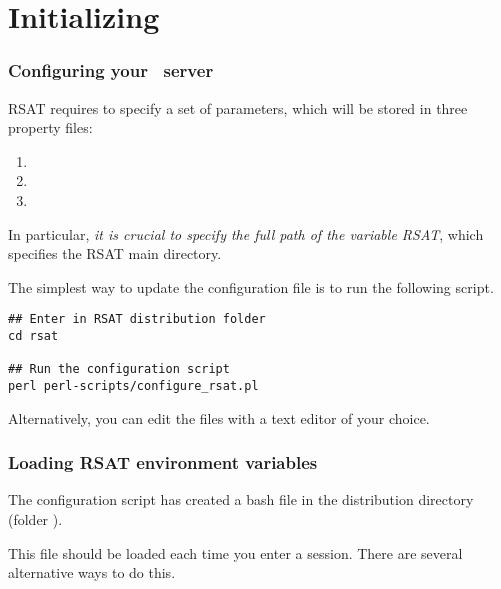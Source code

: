 \documentclass[12pt,a4paper, oneside]{scrreprt} %
\begin{document}
\chapter{Initializing \RSAT}

% 

\subsection{Configuring your \RSAT\ server}

RSAT requires to specify a set of parameters, which will be stored in
three property files:
\begin{enumerate}
\item  {}
\item  {}
\item  {}
\end{enumerate}

In particular, \emph{it is crucial to specify the full path of the
  variable RSAT}, which specifies the RSAT main directory.

The simplest way to update the configuration file is to run the
following script.

\begin{lstlisting}
## Enter in RSAT distribution folder
cd rsat

## Run the configuration script
perl perl-scripts/configure_rsat.pl
\end{lstlisting}

Alternatively, you can edit the files with a text editor of your
choice.

\subsection{Loading RSAT environment variables}

The configuration script has created a bash file
 in the \RSAT distribution directory (folder
). 

This file should be loaded each time you enter a session. There are
several alternative ways to do this.
\end{document}
